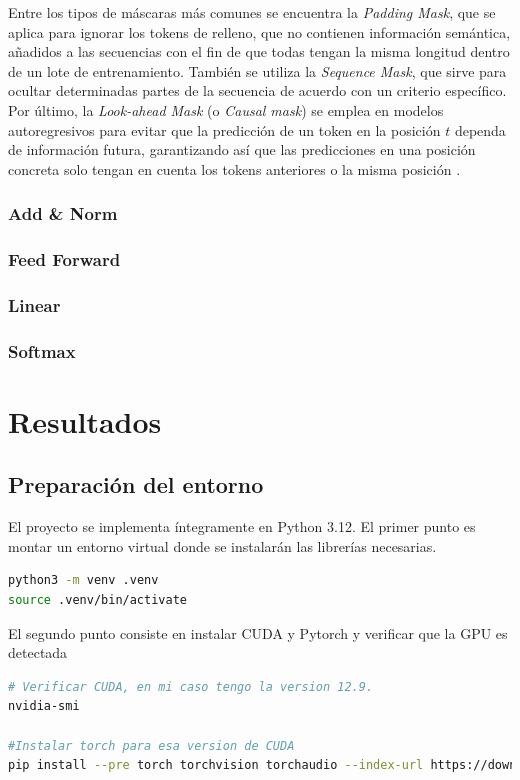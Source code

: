 \documentclass[11pt]{book}
\newcommand{\clearemptydoublepage}{\newpage{\pagestyle{empty}\cleardoublepage}}
\theoremstyle{plain}
\theoremstyle{definition}
\begin{document}
Entre los tipos de máscaras más comunes se encuentra la \textit{Padding Mask}, que se aplica para ignorar los tokens de relleno, que no contienen información semántica, añadidos a las secuencias con el fin de que todas tengan la misma longitud dentro de un lote de entrenamiento. También se utiliza la \textit{Sequence Mask}, que sirve para ocultar determinadas partes de la secuencia de acuerdo con un criterio específico. Por último, la \textit{Look-ahead Mask} (o \textit{Causal mask}) se emplea en modelos autoregresivos para evitar que la predicción de un token en la posición $t$ dependa de información futura, garantizando así que las predicciones en una posición concreta solo tengan en cuenta los tokens anteriores o la misma posición \parencite{swarms_masking_pytorch}.


\subsection{Add \& Norm}

\subsection{Feed Forward}
\subsection{Linear}
\subsection{Softmax}


\clearemptydoublepage

\chapter{Resultados}
\section{Preparación del entorno}
El proyecto se implementa íntegramente en Python 3.12. 
El primer punto es montar un entorno virtual donde se instalarán las librerías necesarias.

\begin{lstlisting}[language=bash]
python3 -m venv .venv
source .venv/bin/activate
\end{lstlisting}
El segundo punto consiste en instalar CUDA y Pytorch y verificar que la GPU es detectada
\begin{lstlisting}[language=bash]
# Verificar CUDA, en mi caso tengo la version 12.9.
nvidia-smi

#Instalar torch para esa version de CUDA
pip install --pre torch torchvision torchaudio --index-url https://download.pytorch.org/whl/nightly/cu129
\end{lstlisting}
\end{document}
